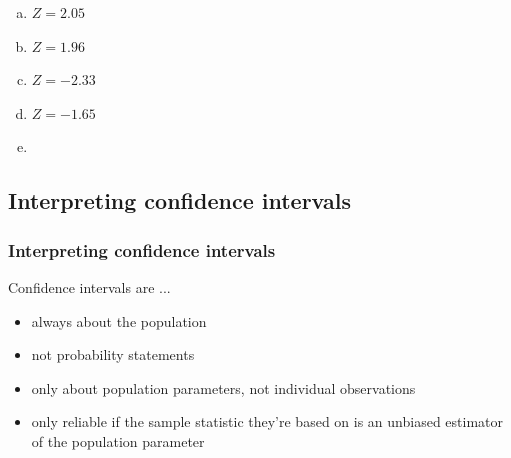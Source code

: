\documentclass[notes,11pt, aspectratio=169]{beamer}
\begin{document}
\begin{frame}


\begin{multicols}{2}
\begin{enumerate}[(a)]
\item $Z = 2.05$
\item $Z = 1.96$
\item $Z = -2.33$
\item $Z = -1.65$
\item[]
\end{enumerate}
\end{multicols}


\end{frame}


\subsection{Interpreting confidence intervals}


\begin{frame}
\frametitle{Interpreting confidence intervals}

Confidence intervals are ...

\begin{itemize}

\item always about the population

\item not probability statements 

\item only about population parameters, not individual observations

\item only reliable if the sample statistic they're based on is an unbiased estimator of the population parameter

\end{itemize}

\end{frame}
\end{document}
